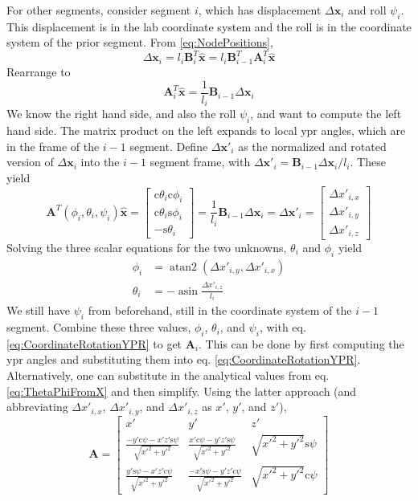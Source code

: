 \documentclass {scrbook}
\DeclareMathOperator{\asin}{asin}
\DeclareMathOperator{\atantwo}{atan2}
\begin{document}
For other segments, consider segment $i$, which has displacement $\Delta \bm{x}_i$ and roll $\psi_i$. This displacement is in the lab coordinate system and the roll is in the coordinate system of the prior segment. From \ref{eq:NodePositions},
$$\Delta \bm{x}_i = l_i \bm{B}^T_i \hat{\bm{x}} = l_i \bm{B}^T_{i-1} \bm{A}^T_i \hat{\bm{x}}$$
Rearrange to
\begin{equation}
\bm{A}^T_i \hat{\bm{x}} = \frac{1}{l_i} \bm{B}_{i-1} \Delta \bm{x}_i
\label{eq:AFromB}
\end{equation}
We know the right hand side, and also the roll $\psi_i$, and want to compute the left hand side. The matrix product on the left expands to local ypr angles, which are in the frame of the $i-1$ segment. Define $\Delta \bm{x}'_i$ as the normalized and rotated version of $\Delta \bm{x}_i$ into the $i-1$ segment frame, with $\Delta \bm{x}'_i = \bm{B}_{i-1} \Delta \bm{x}_i/l_i$. These yield
$$\bm{A}^T(\phi_i,\theta_i,\psi_i) \hat{\bm{x}}
= \left[ \begin{array}{c} \textrm{c} \theta_i \textrm{c} \phi_i \\ \textrm{c} \theta_i \textrm{s} \phi_i \\ -\textrm{s} \theta_i \end{array} \right]
= \frac{1}{l_i} \bm{B}_{i-1} \Delta \bm{x}_i
= \Delta \bm{x}'_i
= \left[ \begin{array}{c} \Delta x'_{i,x} \\ \Delta x'_{i,y} \\ \Delta x'_{i,z} \end{array} \right]$$
Solving the three scalar equations for the two unknowns, $\theta_i$ and $\phi_i$ yield
\begin{align}
\phi_i &= \atantwo(\Delta x'_{i,y}, \Delta x'_{i,x}) \nonumber \\
\theta_i &= -\asin \frac{\Delta x'_{i,z}}{l_i}
\label{eq:ThetaPhiFromX}
\end{align}
We still have $\psi_i$ from beforehand, still in the coordinate system of the $i-1$ segment. Combine these three values, $\phi_i$, $\theta_i$, and $\psi_i$, with eq. \ref{eq:CoordinateRotationYPR} to get $\bm{A}_i$. This can be done by first computing the ypr angles and substituting them into eq. \ref{eq:CoordinateRotationYPR}. Alternatively, one can substitute in the analytical values from eq. \ref{eq:ThetaPhiFromX} and then simplify. Using the latter approach (and abbreviating $\Delta x'_{i,x}$, $\Delta x'_{i,y}$, and $\Delta x'_{i,z}$ as $x'$, $y'$, and $z'$),
$$\bm{A} = \left[ \begin{array}{ccc}
x' & y' & z' \\
\frac{-y' \textrm{c} \psi - x'z' \textrm{s} \psi}{\sqrt{x'^2+y'^2}} &
\frac{x' \textrm{c} \psi - y'z' \textrm{s} \psi}{\sqrt{x'^2+y'^2}} &
\sqrt{x'^2+y'^2}\textrm{s} \psi \\
\frac{y' \textrm{s} \psi - x'z' \textrm{c} \psi}{\sqrt{x'^2+y'^2}} &
\frac{- x' \textrm{s} \psi - y'z' \textrm{c} \psi}{\sqrt{x'^2+y'^2}} &
\sqrt{x'^2+y'^2}\textrm{c} \psi
 \end{array} \right]$$
\end{document}
